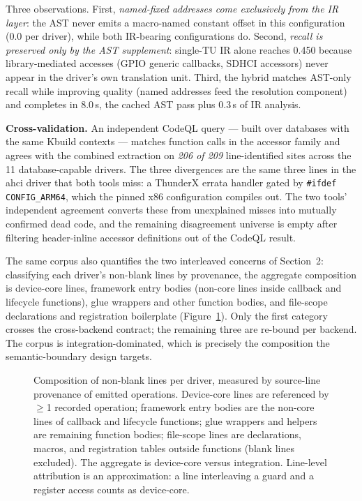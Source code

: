 Three observations. First, \emph{named-fixed addresses come exclusively from
the IR layer}: the AST never emits a macro-named constant offset in this
configuration (0.0 per driver), while both IR-bearing configurations do.
Second, \emph{recall is preserved only by the AST supplement}: single-TU IR
alone reaches 0.450 because library-mediated accesses (GPIO generic
callbacks, SDHCI accessors) never appear in the driver's own translation
unit. Third, the hybrid matches AST-only recall while improving quality
(named addresses feed the resolution component) and completes in 8.0\,s,
the cached AST pass plus 0.3\,s of IR analysis.

\textbf{Cross-validation.} An independent CodeQL query --- built over
databases with the same Kbuild contexts --- matches function calls in
the accessor family and agrees with the combined extraction on \emph{206
of 209} line-identified sites across the 11 database-capable drivers. The three
divergences are the same three lines in the ahci driver that both tools
miss: a ThunderX errata handler gated by \texttt{\#ifdef CONFIG\_ARM64},
which the pinned x86 configuration compiles out. The two tools'
independent agreement converts these from unexplained misses into mutually
confirmed dead code, and the remaining disagreement universe is empty after
filtering header-inline accessor definitions out of the CodeQL result.

The same corpus also quantifies the two interleaved concerns of Section~2:
classifying each driver's non-blank lines by provenance, the aggregate
composition is \GlueCorePct{} device-core lines, \GlueEntryPct{} framework
entry bodies (non-core lines inside callback and lifecycle functions),
\GlueHelperPct{} glue wrappers and other function bodies, and
\GlueFileScopePct{} file-scope declarations and registration boilerplate
(Figure~\ref{fig:glue-ratio}). Only the first category crosses the
cross-backend contract; the remaining three are re-bound per backend. The
corpus is integration-dominated, which is precisely the composition the
semantic-boundary design targets.

\begin{figure}[t]
\centering
\resizebox{\columnwidth}{!}{\GlueRatioChart}
\caption{Composition of non-blank lines per driver, measured by source-line
provenance of emitted operations. Device-core lines are referenced by
$\ge$1 recorded operation; framework entry bodies are the non-core lines of
callback and lifecycle functions; glue wrappers and helpers are remaining
function bodies; file-scope lines are declarations, macros, and registration
tables outside functions (blank lines excluded). The aggregate is
\GlueCorePct{} device-core versus \GlueGluePct{} integration. Line-level
attribution is an approximation: a line interleaving a guard and a register
access counts as device-core.}
\label{fig:glue-ratio}
\end{figure}

